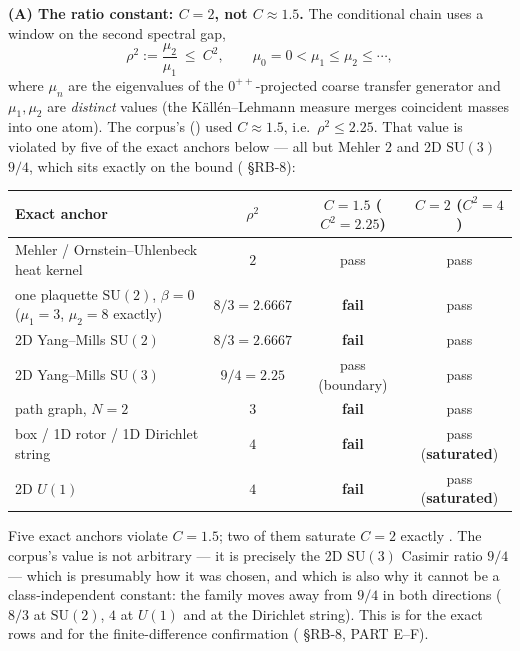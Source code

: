 \textbf{(A) The ratio constant: $C=2$, not $C\approx1.5$.} The conditional chain uses a window on
the second spectral gap,
\begin{equation}
  \rho^2:=\frac{\mu_2}{\mu_1}\ \le\ C^2 ,
  \qquad \mu_0=0<\mu_1\le\mu_2\le\cdots ,
  \label{eq:window}
\end{equation}
where $\mu_n$ are the eigenvalues of the $0^{++}$-projected coarse transfer generator and
$\mu_1,\mu_2$ are \emph{distinct} values (the K\"all\'en--Lehmann measure merges coincident masses
into one atom). The corpus's  () used
$C\approx1.5$, i.e.\ $\rho^2\le2.25$. That value is
violated by five of the exact anchors below --- all but Mehler $2$ and 2D $\mathrm{SU}(3)$ $9/4$,
which sits exactly on the bound ( \S RB-8):

\begin{center}
\footnotesize
\begin{tabular}{@{}lccc@{}}
\toprule
\textbf{Exact anchor} & $\rho^2$ & $C=1.5$ ($C^2=2.25$) & $C=2$ ($C^2=4$)\\
\midrule
Mehler / Ornstein--Uhlenbeck heat kernel & $2$ & pass & pass\\
one plaquette $\mathrm{SU}(2)$, $\beta=0$ ($\mu_1=3$, $\mu_2=8$ exactly) & $8/3=2.6667$ & \textbf{fail} & pass\\
2D Yang--Mills $\mathrm{SU}(2)$ & $8/3=2.6667$ & \textbf{fail} & pass\\
2D Yang--Mills $\mathrm{SU}(3)$ & $9/4=2.25$ & pass (boundary) & pass\\
path graph, $N=2$ & $3$ & \textbf{fail} & pass\\
box / 1D rotor / 1D Dirichlet string & $4$ & \textbf{fail} & pass (\textbf{saturated})\\
2D $U(1)$ & $4$ & \textbf{fail} & pass (\textbf{saturated})\\
\bottomrule
\end{tabular}
\end{center}

Five exact anchors violate $C=1.5$; two of them saturate $C=2$ exactly \LT. The corpus's value is not
arbitrary --- it is precisely the 2D $\mathrm{SU}(3)$ Casimir ratio $9/4$ --- which is presumably
how it was chosen, and which is also why it cannot be a class-independent constant: the family moves away
from $9/4$ in both directions ($8/3$ at $\mathrm{SU}(2)$, $4$ at $U(1)$ and at the
Dirichlet string). This is \LT{} for the exact rows and \LE{} for the finite-difference
confirmation ( \S RB-8, PART E--F).

